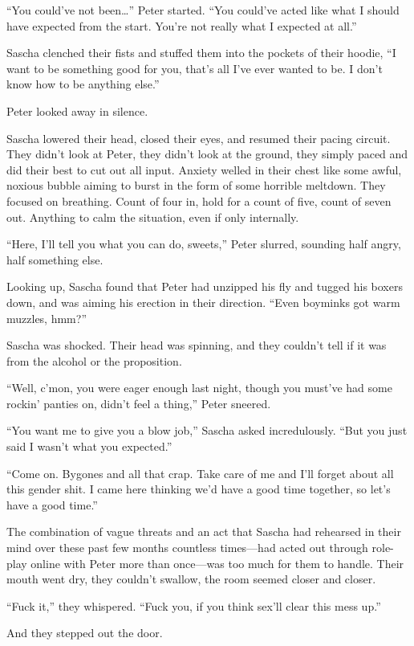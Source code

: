 ``You could've not been\ldots{}'' Peter started. ``You could've acted like what I should have expected from the start. You're not really what I expected at all.''

Sascha clenched their fists and stuffed them into the pockets of their hoodie, ``I want to be something good for you, that's all I've ever wanted to be. I don't know how to be anything else.''

Peter looked away in silence.

Sascha lowered their head, closed their eyes, and resumed their pacing circuit. They didn't look at Peter, they didn't look at the ground, they simply paced and did their best to cut out all input. Anxiety welled in their chest like some awful, noxious bubble aiming to burst in the form of some horrible meltdown. They focused on breathing. Count of four in, hold for a count of five, count of seven out. Anything to calm the situation, even if only internally.

``Here, I'll tell you what you can do, sweets,'' Peter slurred, sounding half angry, half something else.

Looking up, Sascha found that Peter had unzipped his fly and tugged his boxers down, and was aiming his erection in their direction. ``Even boyminks got warm muzzles, hmm?''

Sascha was shocked. Their head was spinning, and they couldn't tell if it was from the alcohol or the proposition.

``Well, c'mon, you were eager enough last night, though you must've had some rockin' panties on, didn't feel a thing,'' Peter sneered.

``You want me to give you a blow job,'' Sascha asked incredulously. ``But you just said I wasn't what you expected.''

``Come on. Bygones and all that crap. Take care of me and I'll forget about all this gender shit. I came here thinking we'd have a good time together, so let's have a good time.''

The combination of vague threats and an act that Sascha had rehearsed in their mind over these past few months countless times---had acted out through role-play online with Peter more than once---was too much for them to handle. Their mouth went dry, they couldn't swallow, the room seemed closer and closer.

``Fuck it,'' they whispered. ``Fuck you, if you think sex'll clear this mess up.''

And they stepped out the door.

